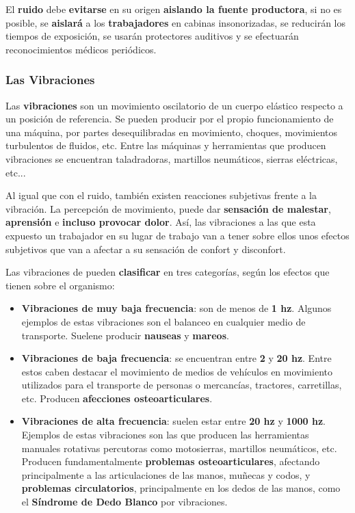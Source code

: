 El \textbf{ruido} debe \textbf{evitarse} en su origen \textbf{aislando la fuente productora}, si no es posible, se \textbf{aislará} a los \textbf{trabajadores} en cabinas insonorizadas, se reducirán los tiempos de exposición, se usarán protectores auditivos y se efectuarán reconocimientos médicos periódicos.

\subsubsection{Las Vibraciones}
Las \textbf{vibraciones} son un movimiento oscilatorio de un cuerpo elástico respecto  a un posición de referencia. Se pueden producir por el propio funcionamiento de una máquina, por partes desequilibradas en movimiento, choques, movimientos turbulentos de fluidos, etc. Entre las máquinas y herramientas que producen vibraciones se encuentran taladradoras, martillos neumáticos, sierras eléctricas, etc...

Al igual que con el ruido, también existen reacciones subjetivas frente a la vibración. La percepción de movimiento, puede dar \textbf{sensación de malestar}, \textbf{aprensión} e \textbf{incluso provocar dolor}. Así, las vibraciones a las que esta expuesto un trabajador en su lugar de trabajo van a tener sobre ellos unos efectos subjetivos que van a afectar a su sensación de confort y disconfort.

Las vibraciones de pueden \textbf{clasificar} en tres categorías, según los efectos que tienen sobre el organismo:

\begin{itemize}
    \item \textbf{Vibraciones de muy baja frecuencia}: son de menos de \textbf{1 hz}. Algunos ejemplos de estas vibraciones son el balanceo en cualquier medio de transporte. Suelene producir \textbf{nauseas} y \textbf{mareos}.

    \item \textbf{Vibraciones de baja frecuencia}: se encuentran entre \textbf{2} y \textbf{20 hz}. Entre estos caben destacar el movimiento de medios de vehículos en movimiento utilizados para el transporte de personas o mercancías, tractores, carretillas, etc. Producen \textbf{afecciones osteoarticulares}.

    \item \textbf{Vibraciones de alta frecuencia}: suelen estar entre \textbf{20 hz} y \textbf{1000 hz}. Ejemplos de estas vibraciones son las que producen las herramientas manuales rotativas percutoras como motosierras, martillos neumáticos, etc. Producen fundamentalmente \textbf{problemas osteoarticulares}, afectando principalmente a las articulaciones de las manos, muñecas y codos, y \textbf{problemas circulatorios}, principalmente en los dedos de las manos, como el \textbf{Síndrome de Dedo Blanco} por vibraciones.
\end{itemize}

